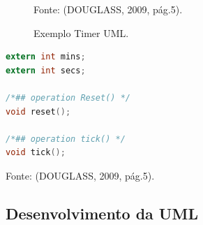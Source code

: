 \begin{figure}[h]
\centering

	Fonte: (DOUGLASS, 2009, pág.5).\linebreak
{}
\caption{Exemplo Timer UML.}
\end{figure}

\newpage

\renewcommand{\lstlistingname}{Código}


\begin{lstlisting}[caption={Transcrição do Timer UML para código em C.},label={lst:codigo3},language=C]
extern int mins; 
extern int secs;

/*## operation Reset() */
void reset();

/*## operation tick() */
void tick();

\end{lstlisting}
\begin{center}
Fonte: (DOUGLASS, 2009, pág.5).
\end{center}

\subsection{Desenvolvimento da UML}

